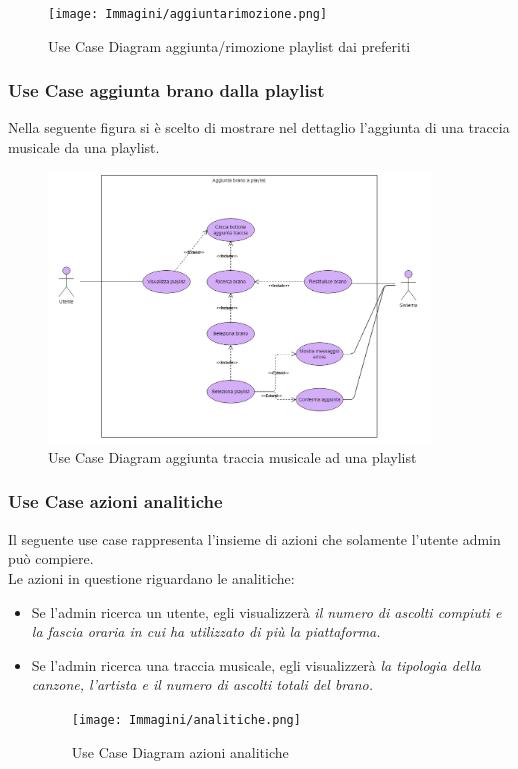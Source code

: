 \documentclass{article}
\begin{document}
			\begin{figure}[H]
				\centering
				\texttt{[image: Immagini/aggiuntarimozione.png]}
				\caption{Use Case Diagram aggiunta/rimozione playlist dai preferiti}
			\end{figure}
			\newpage
			\subsubsection{Use Case aggiunta brano dalla playlist}
			Nella seguente figura si è scelto di mostrare nel dettaglio l'aggiunta di una traccia musicale da una playlist.
			
			\begin{figure}[H]
				\centering
				\includegraphics[width=0.9\textwidth]{Immagini/aggiuntabrano.png}
				\caption{Use Case Diagram aggiunta traccia musicale ad una playlist}
			\end{figure}
			
			\subsubsection{Use Case azioni analitiche}
			Il seguente use case rappresenta l'insieme di azioni che solamente l'utente admin può compiere.\\
			Le azioni in questione riguardano le analitiche:
			\begin{itemize}
				\item Se l'admin ricerca un utente, egli visualizzerà \textit{il numero di ascolti compiuti e la fascia oraria in cui ha utilizzato di più la piattaforma.}
				\item Se l'admin ricerca una traccia musicale, egli visualizzerà \textit{la tipologia della canzone, l'artista e il numero di ascolti totali del brano.}
				
				\begin{figure}[H]
					\centering
					\texttt{[image: Immagini/analitiche.png]}
					\caption{Use Case Diagram azioni analitiche}
				\end{figure}
			\end{itemize}
			\newpage
\end{document}

